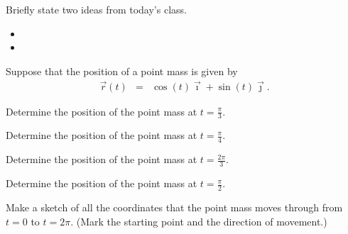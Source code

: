 \postClass

\begin{problem}
\item Briefly state two ideas from today's class.
  \begin{itemize}
  \item 
  \item 
  \end{itemize}
\item 
  \begin{subproblem}
    \item
  \end{subproblem}
\end{problem}



\begin{problem}
\item Suppose that the position of a point mass is given by
  \begin{eqnarray*}
    \vec{r}(t) & = & \cos(t) \vec{\imath} + \sin(t) \vec{\jmath}.
  \end{eqnarray*}
  \begin{subproblem}
  \item Determine the position of the point mass at ${\displaystyle
      t=\frac{\pi}{3}}$.
    \vfill
  \item Determine the position of the point mass at ${\displaystyle
      t=\frac{\pi}{4}}$.
    \vfill
  \item Determine the position of the point mass at ${\displaystyle
      t=\frac{2\pi}{3}}$.
    \vfill
  \item Determine the position of the point mass at ${\displaystyle
      t=\frac{\pi}{2}}$.
    \vfill
    \clearpage
  \item Make a sketch of all the coordinates that the point mass moves
    through from $t=0$ to $t=2\pi$. (Mark the starting point and the
    direction of movement.)
    \vfill
  \end{subproblem}
\end{problem}


